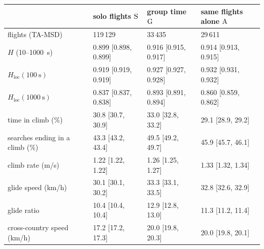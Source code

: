 \begin{tabular}{@{}l l l l@{}}
\toprule
 & solo flights $\mathrm{S}$ & group time $\mathrm{G}$ & same flights alone $\mathrm{A}$ \\
\midrule
flights (TA-MSD) & 119\,129 & 33\,435 & 29\,611 \\
$H$ (10--1000~s) & 0.899 [0.898, 0.899] & 0.916 [0.915, 0.917] & 0.914 [0.913, 0.915] \\
$H_\mathrm{loc}(100~\mathrm{s})$ & 0.919 [0.919, 0.919] & 0.927 [0.927, 0.928] & 0.932 [0.931, 0.932] \\
$H_\mathrm{loc}(1000~\mathrm{s})$ & 0.837 [0.837, 0.838] & 0.893 [0.891, 0.894] & 0.860 [0.859, 0.862] \\
time in climb (\%) & 30.8 [30.7, 30.9] & 33.0 [32.8, 33.2] & 29.1 [28.9, 29.2] \\
searches ending in a climb (\%) & 43.3 [43.2, 43.4] & 49.5 [49.2, 49.7] & 45.9 [45.7, 46.1] \\
climb rate (m/s) & 1.22 [1.22, 1.22] & 1.26 [1.25, 1.27] & 1.33 [1.32, 1.34] \\
glide speed (km/h) & 30.1 [30.1, 30.2] & 33.3 [33.1, 33.5] & 32.8 [32.6, 32.9] \\
glide ratio & 10.4 [10.4, 10.4] & 12.9 [12.8, 13.0] & 11.3 [11.2, 11.4] \\
cross-country speed (km/h) & 17.2 [17.2, 17.3] & 20.0 [19.8, 20.3] & 20.0 [19.8, 20.1] \\
\bottomrule
\end{tabular}
